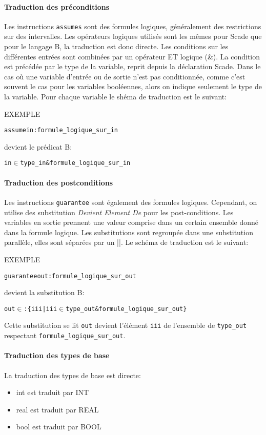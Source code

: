 \paragraph{Traduction des préconditions}
Les instructions \texttt{assumes} sont des formules logiques, généralement des
restrictions sur des intervalles. Les opérateurs logiques utilisés sont les
mêmes pour Scade que pour le langage B, la traduction est donc directe. Les
conditions sur les différentes entrées sont combinées par un opérateur ET
logique (\&). La condition est précédée par le type de la variable, reprit
depuis la déclaration Scade. 
Dans le cas où une variable d'entrée ou de sortie n'est pas conditionnée, comme
c'est souvent le cas pour les variables booléennes, alors on indique seulement
le type de la variable.
Pour chaque variable le shéma de traduction est le suivant:

EXEMPLE

\begin{alltt}
assume in : formule_logique_sur_in
\end{alltt}
devient le prédicat B:
\begin{alltt}
in \(\in\) type\_in & formule\_logique\_sur\_in
\end{alltt}

\paragraph{Traduction des postconditions}
Les instructions \texttt{guarantee} sont également des formules
logiques. Cependant, on utilise des substitution \emph{Devient Element De} pour
les post-conditions. Les variables en sortie prennent une valeur comprise dans
un certain ensemble donné dans la formule logique. Les substitutions sont
regroupée dans une substitution parallèle, elles sont séparées par un ||. Le
schéma de traduction est le suivant:

EXEMPLE 

\begin{alltt}
guarantee out : formule_logique_sur_out
\end{alltt}
devient la substitution B:
\begin{alltt}
out \(\in\): \{ iii | iii \(\in\) type_out & formule_logique_sur_out\}
\end{alltt}
Cette substitution se lit \texttt{out} devient l'élément \texttt{iii} de l'ensemble
de \texttt{type\_out} respectant \texttt{formule\_logique\_sur\_out}.

\paragraph{Traduction des types de base}
La traduction des types de base est directe:
\begin{itemize}
\item int est traduit par INT
\item real est traduit par REAL
\item bool est traduit par BOOL
\end{itemize}

